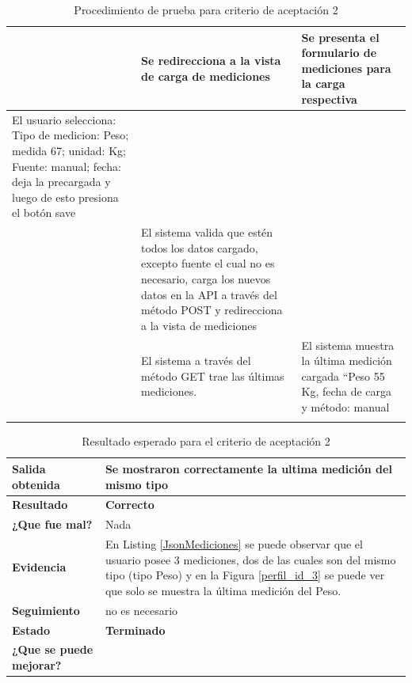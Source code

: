\begin{longtable}{|p{5cm}|p{5cm}|p{4cm}|}
        & Se redirecciona a la vista de carga de mediciones&Se presenta el formulario de mediciones para la carga respectiva\\ \hline
        El usuario selecciona: Tipo de medicion: Peso; medida 67; unidad: Kg; Fuente: manual; fecha: deja la precargada y  luego de esto presiona el botón save& &\\ \hline       
        & El sistema valida que estén todos los datos cargado, excepto fuente el cual no es necesario, carga los nuevos datos en la API a través del método POST y redirecciona a la vista de mediciones&\\ \hline       
        &El sistema a través del método GET trae las últimas mediciones. &El sistema muestra la última medición cargada ``Peso 55 Kg, fecha de carga y método: manual\\ \hline
        \caption{Procedimiento de prueba para criterio de aceptación 2}
        
	    \end{longtable}
        
\clearpage

{\scriptsize
	\begin{table}[h]
	\centering
	\begin{tabular}{|l|p{10cm}|}
	    \hline 
	    \textbf{Salida obtenida}& Se mostraron correctamente la ultima medición del mismo tipo\\ \hline
	    \textbf{Resultado}& \textbf{Correcto}\\ \hline
        \textbf{¿Que fue mal?}& Nada\\ \hline      
        \textbf{Evidencia}& En Listing \ref{JsonMediciones} se puede observar que el usuario posee 3 mediciones, dos de las cuales son del mismo tipo (tipo Peso) y en la Figura \ref{perfil_id_3} se puede ver que solo se muestra la última medición del Peso.  \\ \hline
        \textbf{Seguimiento}& no es necesario\\ \hline
        \textbf{Estado}& \textbf{Terminado}\\ \hline        
        \textbf{¿Que se puede mejorar?}& \\ \hline              
	    \end{tabular}
        \caption{Resultado esperado para el criterio de aceptación 2}
    	\end{table}
	}


